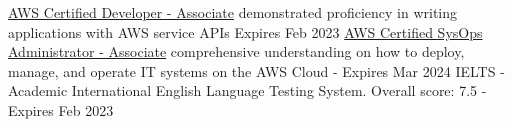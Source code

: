 

\begin{cvskills}

  \cvskill
  {\href{https://www.credly.com/badges/7123e224-cb17-4171-88dd-f34dc9c0af8e}{AWS Certified Developer - Associate}}
  {demonstrated proficiency in writing applications with AWS service APIs Expires Feb 2023}
  \cvskill
  {\href{https://www.credly.com/badges/c7e21149-77de-45cd-b8a7-c6e2896a95ed}{AWS Certified SysOps Administrator - Associate}}
  {
    comprehensive understanding on how to deploy, 
    manage, and \newline operate IT systems on the AWS Cloud - Expires Mar 2024
  }
  \cvskill
  {IELTS - Academic}
  {International English Language Testing System. Overall score: 7.5 - Expires Feb 2023}
  
\end{cvskills}
